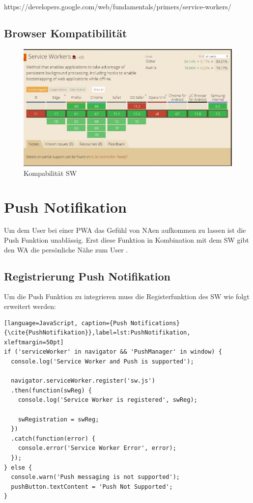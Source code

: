 https://developers.google.com/web/fundamentals/primers/service-workers/
\subsection{Browser Kompatibilität}
\begin{figure}[h]
	\centering
	\includegraphics[width=14cm]{BilderAllgemein/BrowserSW}\medskip
	\caption{Kompabilität \acl{SW} \cite{BrowserSupport}}
	\label{fig:BrowserSW}
\end{figure}

\newpage

\section{Push Notifikation}
Um dem User bei einer \acs{PWA} das Gefühl von \acl{NA}en aufkommen zu lassen ist die Push Funktion unablässig. Erst diese Funktion in Kombination mit dem \acs{SW} gibt den \acl{WA} die persönliche Nähe zum User \cite{PushNotifikation}.



\subsection{Registrierung Push Notifikation}
Um die Push Funktion zu integrieren muss die Registerfunktion des \acs{SW} wie folgt erweitert werden:
 
\begin{lstlisting}[language=JavaScript, caption={Push Notifications} {\cite{PushNotifikation}},label=lst:PushNotifikation, xleftmargin=50pt]
if ('serviceWorker' in navigator && 'PushManager' in window) {
  console.log('Service Worker and Push is supported');

  navigator.serviceWorker.register('sw.js')
  .then(function(swReg) {
    console.log('Service Worker is registered', swReg);

    swRegistration = swReg;
  })
  .catch(function(error) {
    console.error('Service Worker Error', error);
  });
} else {
  console.warn('Push messaging is not supported');
  pushButton.textContent = 'Push Not Supported';
}
\end{lstlisting}

